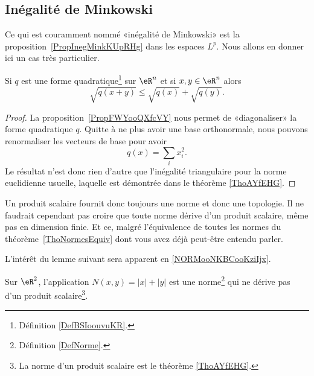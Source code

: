 \subsection{Inégalité de Minkowski}

Ce qui est couramment nommé «inégalité de Minkowski» est la proposition~\ref{PropInegMinkKUpRHg} dans les espaces \( L^p\). Nous allons en donner ici un cas très particulier.

\begin{proposition} \label{PropACHooLtsMUL}
	Si \( q\) est une forme quadratique\footnote{Définition \ref{DefBSIoouvuKR}.} sur \( \eR^n\) et si \( x,y\in \eR^n\) alors
	\begin{equation}
		\sqrt{q(x+y)}\leq\sqrt{q(x)}+\sqrt{q(y)}.
	\end{equation}
\end{proposition}

\begin{proof}
	La proposition~\ref{PropFWYooQXfcVY} nous permet de «diagonaliser» la forme quadratique \( q\). Quitte à ne plus avoir une base orthonormale, nous pouvons renormaliser les vecteurs de base pour avoir
	\begin{equation}
		q(x)=\sum_ix_i^2.
	\end{equation}
	Le résultat n'est donc rien d'autre que l'inégalité triangulaire pour la norme euclidienne usuelle, laquelle est démontrée dans le théorème \ref{ThoAYfEHG}.
\end{proof}


\begin{normaltext}
	Un produit scalaire fournit donc toujours une norme et donc une topologie. Il ne faudrait cependant pas croire que toute norme dérive d'un produit scalaire, même pas en dimension finie. Et ce, malgré l'équivalence de toutes les normes du théorème~\ref{ThoNormesEquiv} dont vous avez déjà peut-être entendu parler.
\end{normaltext}


L'intérêt du lemme suivant sera apparent en \ref{NORMooNKBCooKziIjx}.
\begin{lemma}   \label{LEMooRWJYooOIJkZc}
	Sur \( \eR^2\), l'application \( N(x,y)=| x |+| y |\) est une norme\footnote{Définition \ref{DefNorme}.} qui ne dérive pas d'un produit scalaire\footnote{La norme d'un produit scalaire est le théorème  \ref{ThoAYfEHG}.}.
\end{lemma}

